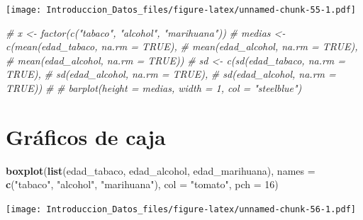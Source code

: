 \documentclass[spanish,]{book}
\newenvironment{Shaded}{\begin{snugshade}}{\end{snugshade}}
\newcommand{\KeywordTok}[1]{\textcolor[rgb]{0.13,0.29,0.53}{\textbf{#1}}}
\newcommand{\DataTypeTok}[1]{\textcolor[rgb]{0.13,0.29,0.53}{#1}}
\newcommand{\DecValTok}[1]{\textcolor[rgb]{0.00,0.00,0.81}{#1}}
\newcommand{\StringTok}[1]{\textcolor[rgb]{0.31,0.60,0.02}{#1}}
\newcommand{\CommentTok}[1]{\textcolor[rgb]{0.56,0.35,0.01}{\textit{#1}}}
\newcommand{\NormalTok}[1]{#1}
\begin{document}
\texttt{[image: Introduccion\_Datos\_files/figure-latex/unnamed-chunk-55-1.pdf]}

\begin{Shaded}
\begin{Highlighting}[]
\CommentTok{# x <- factor(c("tabaco", "alcohol", "marihuana"))}
\CommentTok{# medias <- c(mean(edad_tabaco, na.rm = TRUE),}
\CommentTok{#             mean(edad_alcohol, na.rm = TRUE),}
\CommentTok{#             mean(edad_alcohol, na.rm = TRUE))}
\CommentTok{# sd <- c(sd(edad_tabaco, na.rm = TRUE),}
\CommentTok{#         sd(edad_alcohol, na.rm = TRUE),}
\CommentTok{#         sd(edad_alcohol, na.rm = TRUE))}
\CommentTok{# }
\CommentTok{# barplot(height = medias, width = 1, col = "steelblue")}
\end{Highlighting}
\end{Shaded}

\section{Gráficos de caja}\label{graficos-de-caja}

\begin{Shaded}
\begin{Highlighting}[]
\KeywordTok{boxplot}\NormalTok{(}\KeywordTok{list}\NormalTok{(edad_tabaco, edad_alcohol, edad_marihuana),}
        \DataTypeTok{names =} \KeywordTok{c}\NormalTok{(}\StringTok{"tabaco"}\NormalTok{, }\StringTok{"alcohol"}\NormalTok{, }\StringTok{"marihuana"}\NormalTok{),}
        \DataTypeTok{col =} \StringTok{"tomato"}\NormalTok{,}
        \DataTypeTok{pch =} \DecValTok{16}\NormalTok{)}
\end{Highlighting}
\end{Shaded}

\texttt{[image: Introduccion\_Datos\_files/figure-latex/unnamed-chunk-56-1.pdf]}


\end{document}
